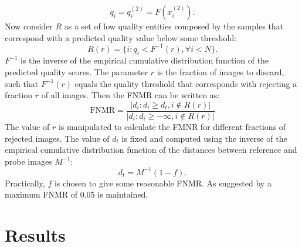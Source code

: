\documentclass[letterpaper]{article} %
\begin{document}
\begin{equation}
q_i = q_i^{(2)} = F(x_i^{(2)}).
\end{equation}
Now consider $R$ as a set of low quality entities composed by the samples that correspond with a predicted quality value below some threshold:
\begin{equation}
R(r) = \{i : q_i < F^{-1}(r),  \forall i < N \}.
\end{equation}
$F^{-1}$ is the inverse of the empirical cumulative distribution function of the predicted quality scores. The parameter $r$ is the fraction of images to discard, such that $F^{-1}(r)$ equals the quality threshold that corresponds with rejecting a fraction $r$ of all images. Then the FNMR can be written as:
\begin{equation}
\mathrm{FNMR} = \frac{|d_i : d_i \geq d_t, i \notin R(r)|}{|d_i : d_i \geq -\infty, i \notin R(r)|}
\end{equation}
The value of $r$ is manipulated to calculate the FMNR for different fractions of rejected images. The value of $d_t$ is fixed and computed using the inverse of the empirical cumulative distribution function of the distances between reference and probe images $M^{-1}$:
\begin{equation}
d_t = M^{-1}(1 - f).
\end{equation}
Practically, $f$ is chosen to give some reasonable FNMR. As suggested by \cite{frontex} a maximum FNMR of 0.05 is maintained.
\section{Results}
\label{section:results}
\end{document}
